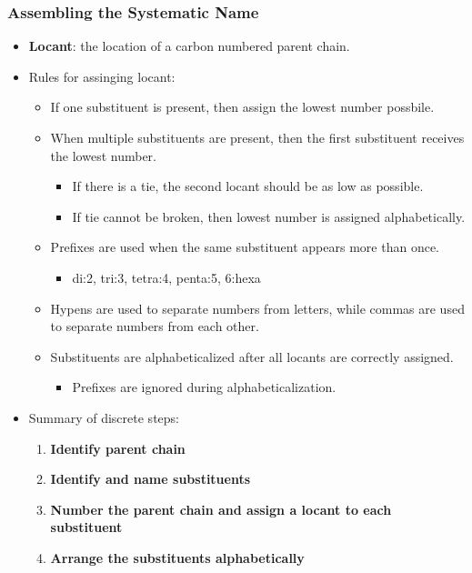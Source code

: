 \documentclass[12pt,a4paper]{article}
\begin{document}
\begin{itemize}
    \subsubsection{Assembling the Systematic Name}
    \begin{itemize}
        \item \textbf{Locant}: the location of a carbon numbered parent chain.
        \item Rules for assinging locant:
            \begin{itemize}
                \item If one substituent is present, then assign the lowest number possbile.
                \item When multiple substituents are present, then the first substituent receives the lowest number. 
                    \begin{itemize}
                        \item If there is a tie, the second locant should be as low as possible.
                        \item If tie cannot be broken, then lowest number is assigned alphabetically.
                    \end{itemize}
                \item Prefixes are used when the same substituent appears more than once. 
                    \begin{itemize}
                        \item di:2, tri:3, tetra:4, penta:5, 6:hexa
                    \end{itemize}
                \item Hypens are used to separate numbers from letters, while commas are used to separate numbers from each other.
                \item Substituents are alphabeticalized after all locants are correctly assigned.
                    \begin{itemize}
                        \item Prefixes are ignored during alphabeticalization.
                    \end{itemize}
            \end{itemize}
        \item Summary of discrete steps:
            \begin{enumerate}
                \item \textbf{Identify parent chain}
                \item \textbf{Identify and name substituents}
                \item \textbf{Number the parent chain and assign a locant to each substituent}
                \item \textbf{Arrange the substituents alphabetically}
            \end{enumerate}
    \end{itemize}
\end{itemize}
\end{document}

